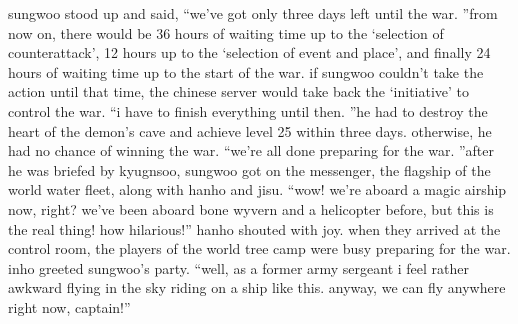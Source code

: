 sungwoo stood up and said, “we’ve got only three days left until the war.
”from now on, there would be 36 hours of waiting time up to the ‘selection of counterattack’, 12 hours up to the ‘selection of event and place’, and finally 24 hours of waiting time up to the start of the war.
 if sungwoo couldn’t take the action until that time, the chinese server would take back the ‘initiative’ to control the war.
“i have to finish everything until then.
”he had to destroy the heart of the demon’s cave and achieve level 25 within three days.
otherwise, he had no chance of winning the war.
“we’re all done preparing for the war.
”after he was briefed by kyugnsoo, sungwoo got on the messenger, the flagship of the world water fleet, along with hanho and jisu.
“wow! we’re aboard a magic airship now, right? we’ve been aboard bone wyvern and a helicopter before, but this is the real thing! how hilarious!” hanho shouted with joy.
when they arrived at the control room, the players of the world tree camp were busy preparing for the war.
inho greeted sungwoo’s party.
“well, as a former army sergeant i feel rather awkward flying in the sky riding on a ship like this.
 anyway, we can fly anywhere right now, captain!”

 